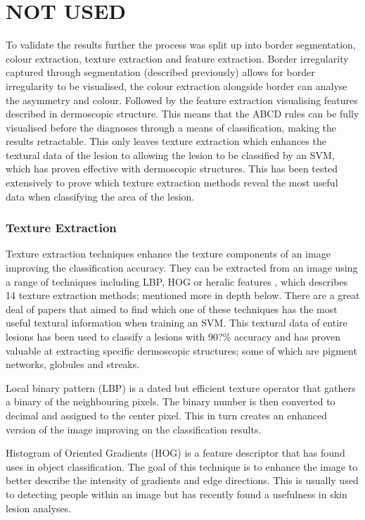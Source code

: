 \documentclass[12pt]{report}
\begin{document}
\chapter{NOT USED}
To validate the results further the process was split up into border segmentation, colour extraction, texture extraction\cite{Filali2019} and feature extraction. Border irregularity captured through segmentation (described previously) allows for border irregularity to be visualised, the colour extraction alongside border can analyse the asymmetry and colour. Followed by the feature extraction visualising features described in dermoscopic structure. This means that the ABCD rules can be fully visualised before the diagnoses through a means of classification, making the results retractable. This only leaves texture extraction which enhances the textural data of the lesion to allowing the lesion to be classified by an SVM, which has proven effective with dermoscopic structures. This has been tested extensively to prove which texture extraction methods reveal the most useful data when classifying the area of the lesion.

\subsection{Texture Extraction}
Texture extraction techniques enhance the texture components of an image improving the classification accuracy. They can be extracted from an image using a range of techniques including LBP, HOG\cite{Khan2018} or heralic features \cite{Filali2019, Khan2018}, which describes 14 texture extraction methods; mentioned more in depth below. There are a great deal of papers that aimed to find which one of these techniques has the most useful textural information when training an SVM. This textural data of entire lesions has been used to classify a lesions with 90?\% accuracy and has proven valuable at extracting specific dermoscopic structures; some of which are pigment networks\cite{Arroyo2014}, globules and streaks.

Local binary pattern (LBP) is a dated but efficient texture operator that gathers a binary of the neighbouring pixels. The binary number is then converted to decimal and assigned to the center pixel. This in turn creates an enhanced version of the image improving on the classification results.

Histogram of Oriented Gradients (HOG) is a feature descriptor that has found uses in object classification. The goal of this technique is to enhance the image to better describe the intensity of gradients and edge directions. This is usually used to detecting people within an image but has recently found a usefulness in skin lesion analyses.
\end{document}
